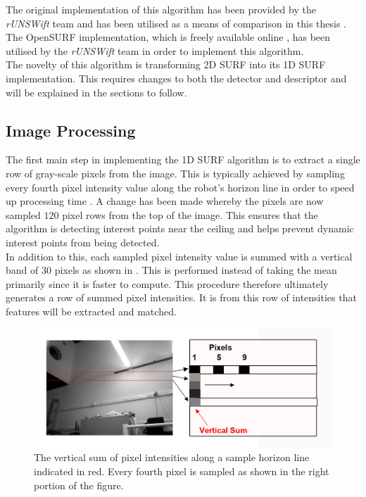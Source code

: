 The original implementation of this algorithm has been provided by the \textit{rUNSWift} team and has been utilised as a means of comparison in this thesis \citep{Anderson}. The OpenSURF implementation, which is freely available online \citep{opensurf}, has been utilised by the \textit{rUNSWift} team in order to implement this algorithm.\\

The novelty of this algorithm is transforming 2D SURF into its 1D SURF implementation. This requires changes to both the detector and descriptor and will be explained in the sections to follow.\\

\subsection{Image Processing}
\label{sec:imageProcessing}
The first main step in implementing the 1D SURF algorithm is to extract a single row of gray-scale pixels from the image. This is typically achieved by sampling every fourth pixel intensity value along the robot's horizon line \citep{Bhuman} in order to speed up processing time \citep{Anderson}. A change has been made whereby the pixels are now sampled $120$ pixel rows from the top of the image. This ensures that the algorithm is detecting interest points near the ceiling and helps prevent dynamic interest points from being detected.\\

In addition to this, each sampled pixel intensity value is summed with a vertical band of $30$ pixels as shown in . This is performed instead of taking the mean primarily since it is faster to compute. This procedure therefore ultimately generates a row of summed pixel intensities. It is from this row of intensities that features will be extracted and matched.\\

\begin{figure}[h!] 
  \centering
    \includegraphics[width=1.0\textwidth]{../Drawings/methods/horizon.jpg}
    \caption{The vertical sum of pixel intensities along a sample horizon line indicated in red. Every fourth pixel is sampled as shown in the right portion of the figure. }
    \label{fig:rows}
\end{figure}

